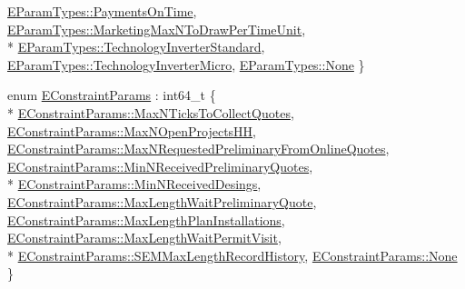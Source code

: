 \begin{DoxyCompactItemize}
\hyperlink{namespacesolar__core_aa1147341e5ef7a40d68d1bd68e149362a7863d48ef49981916e8a483f2171b306}{E\+Param\+Types\+::\+Payments\+On\+Time}, 
\hyperlink{namespacesolar__core_aa1147341e5ef7a40d68d1bd68e149362a56319e8e21c87c38fb797f23a73f5fe3}{E\+Param\+Types\+::\+Marketing\+Max\+N\+To\+Draw\+Per\+Time\+Unit}, 
\\*
\hyperlink{namespacesolar__core_aa1147341e5ef7a40d68d1bd68e149362a1a190aa7a38d2e8a842cd07e17dfac09}{E\+Param\+Types\+::\+Technology\+Inverter\+Standard}, 
\hyperlink{namespacesolar__core_aa1147341e5ef7a40d68d1bd68e149362acff31f4237035a33c80d603fd67f6abd}{E\+Param\+Types\+::\+Technology\+Inverter\+Micro}, 
\hyperlink{namespacesolar__core_aa1147341e5ef7a40d68d1bd68e149362a6adf97f83acf6453d4a6a4b1070f3754}{E\+Param\+Types\+::\+None}
 \}
\item 
enum \hyperlink{namespacesolar__core_ac827fdef4412a3c0d5e44d3f31908e49}{E\+Constraint\+Params} \+: int64\+\_\+t \{ \\*
\hyperlink{namespacesolar__core_ac827fdef4412a3c0d5e44d3f31908e49a79b059203dc39b55d85046f355d1fa95}{E\+Constraint\+Params\+::\+Max\+N\+Ticks\+To\+Collect\+Quotes}, 
\hyperlink{namespacesolar__core_ac827fdef4412a3c0d5e44d3f31908e49a5d0891420ec7c6769c9ece305c98daac}{E\+Constraint\+Params\+::\+Max\+N\+Open\+Projects\+H\+H}, 
\hyperlink{namespacesolar__core_ac827fdef4412a3c0d5e44d3f31908e49ae497930a8f22e14387bac31ebe737a64}{E\+Constraint\+Params\+::\+Max\+N\+Requested\+Preliminary\+From\+Online\+Quotes}, 
\hyperlink{namespacesolar__core_ac827fdef4412a3c0d5e44d3f31908e49a2e66c9bd577b41e92fd40c619a886559}{E\+Constraint\+Params\+::\+Min\+N\+Received\+Preliminary\+Quotes}, 
\\*
\hyperlink{namespacesolar__core_ac827fdef4412a3c0d5e44d3f31908e49a177186685b2d9651d26b48cb4ad61cc6}{E\+Constraint\+Params\+::\+Min\+N\+Received\+Desings}, 
\hyperlink{namespacesolar__core_ac827fdef4412a3c0d5e44d3f31908e49aa27f1df5083a611e423ed8531aad5cd3}{E\+Constraint\+Params\+::\+Max\+Length\+Wait\+Preliminary\+Quote}, 
\hyperlink{namespacesolar__core_ac827fdef4412a3c0d5e44d3f31908e49a343e282b2f49a70e6df068f1bca38402}{E\+Constraint\+Params\+::\+Max\+Length\+Plan\+Installations}, 
\hyperlink{namespacesolar__core_ac827fdef4412a3c0d5e44d3f31908e49a8c0f94b4a281d1e2221b3160596f4283}{E\+Constraint\+Params\+::\+Max\+Length\+Wait\+Permit\+Visit}, 
\\*
\hyperlink{namespacesolar__core_ac827fdef4412a3c0d5e44d3f31908e49ac75cfee3c5e5c1d3c4b15f53ab4cc718}{E\+Constraint\+Params\+::\+S\+E\+M\+Max\+Length\+Record\+History}, 
\hyperlink{namespacesolar__core_ac827fdef4412a3c0d5e44d3f31908e49a6adf97f83acf6453d4a6a4b1070f3754}{E\+Constraint\+Params\+::\+None}
 \}
\end{DoxyCompactItemize}
